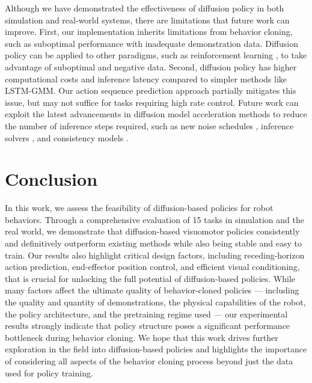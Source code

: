 \documentclass[Afour,sageh,times]{sagej}
\newcommand{\ben}[1]{\textcolor{MyGold}{[Ben: #1]}}
\begin{document}
Although we have demonstrated the effectiveness of diffusion policy in both simulation and real-world systems, there are limitations that future work can improve. 
First, our implementation inherits limitations from behavior cloning, such as suboptimal performance with inadequate demonstration data. Diffusion policy can be applied to other paradigms, such as reinforcement learning \cite{wang2023diffusion,hansen2023idql}, to take advantage of suboptimal and negative data. 
Second, diffusion policy has higher computational costs and inference latency compared to simpler methods like LSTM-GMM. Our action sequence prediction approach partially mitigates this issue, but may not suffice for tasks requiring high rate control. Future work can exploit the latest advancements in diffusion model acceleration methods to reduce the number of inference steps required, such as new noise schedules \cite{chen2023importance}, inference solvers \cite{karras2022elucidating}, and consistency models \cite{song2023consistency}.


\section{Conclusion}

In this work, we assess the feasibility of diffusion-based policies for robot behaviors. Through a comprehensive evaluation of 15 tasks in simulation and the real world, we demonstrate that diffusion-based visuomotor policies consistently and definitively outperform existing methods while also being stable and easy to train. Our results also highlight critical design factors, including receding-horizon action prediction, end-effector position control, and efficient visual conditioning, that is crucial for unlocking the full potential of diffusion-based policies. While many factors affect the ultimate quality of behavior-cloned policies --- including the quality and quantity of demonstrations, the physical capabilities of the robot, the policy architecture, and the pretraining regime used --- our experimental results strongly indicate that policy structure poses a significant performance bottleneck during behavior cloning. We hope that this work drives further exploration in the field into diffusion-based policies and highlights the importance of considering all aspects of the behavior cloning process beyond just the data used for policy training.
\end{document}
